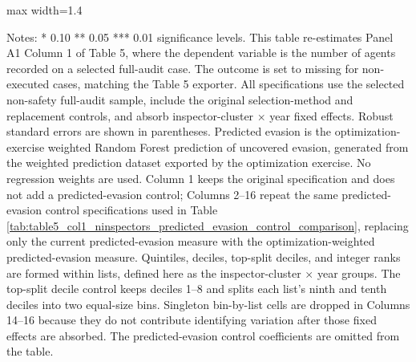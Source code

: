 \documentclass{article}
\newcommand{\OutPath}{Output/}%
\newcommand{\OutPath}{../Output/}%
\begin{document}
\begin{landscape}
\begin{table}[H]\centering
\begin{adjustbox}{max width=1.4\textwidth}
\begin{threeparttable}
\caption{Table 5 Panel A1 Column 1: Number of Agents Varying Predicted Evasion Control Specification, Optimization-Weighted Predictions}
\label{tab:table5_col1_ninspectors_predicted_evasion_control_comparison_optimization_weighted}

\footnotesize


\begin{tablenotes}[flushleft]
\footnotesize
\item Notes: * 0.10 ** 0.05 *** 0.01 significance levels. This table re-estimates Panel A1 Column 1 of Table 5, where the dependent variable is the number of agents recorded on a selected full-audit case. The outcome is set to missing for non-executed cases, matching the Table 5 exporter. All specifications use the selected non-safety full-audit sample, include the original selection-method and replacement controls, and absorb inspector-cluster $\times$ year fixed effects. Robust standard errors are shown in parentheses. Predicted evasion is the optimization-exercise weighted Random Forest prediction of uncovered evasion, generated from the weighted prediction dataset exported by the optimization exercise. No regression weights are used. Column 1 keeps the original specification and does not add a predicted-evasion control; Columns 2--16 repeat the same predicted-evasion control specifications used in Table \ref{tab:table5_col1_ninspectors_predicted_evasion_control_comparison}, replacing only the current predicted-evasion measure with the optimization-weighted predicted-evasion measure. Quintiles, deciles, top-split deciles, and integer ranks are formed within lists, defined here as the inspector-cluster $\times$ year groups. The top-split decile control keeps deciles 1--8 and splits each list's ninth and tenth deciles into two equal-size bins. Singleton bin-by-list cells are dropped in Columns 14--16 because they do not contribute identifying variation after those fixed effects are absorbed. The predicted-evasion control coefficients are omitted from the table.
\end{tablenotes}
\end{threeparttable}
\end{adjustbox}
\end{table}


\end{landscape}
\end{document}
